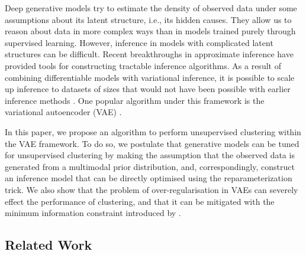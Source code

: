 \documentclass{article} \usepackage{iclr2017_conference,times}
\begin{document}
Deep generative models try to estimate the density of observed data under some assumptions about its latent structure, i.e., its hidden causes. They allow us to reason about data in  more complex ways than in models trained purely through supervised learning. However, inference in models with complicated latent structures can be difficult. Recent breakthroughs in approximate inference have provided  tools for constructing tractable inference algorithms. As a result of combining differentiable models with variational inference, it is possible to scale up inference to datasets of sizes that would not have been possible with earlier inference methods \citep{rezende2014stochastic}. One popular algorithm under this framework is the variational autoencoder (VAE) \citep{kingma2013auto, rezende2014stochastic}.

In this paper, we propose an algorithm to perform unsupervised clustering within the VAE framework. To do so, we postulate that generative models can be tuned for unsupervised clustering by making the assumption that the observed data is generated from a multimodal prior distribution, and, correspondingly, construct an inference model that can be directly optimised using the reparameterization trick. We also show that the problem of over-regularisation in VAEs can severely effect the performance of clustering, and that it can be mitigated with the minimum information constraint introduced by \cite{kingma2016improving}.

\subsection{Related Work}
\end{document}
